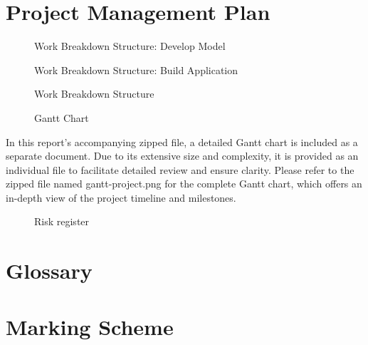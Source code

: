 \documentclass[journal, draftcls]{IEEEtran}
\begin{document}
\section{Project Management Plan}
\begin{figure}[ht]
    
    \caption{Work Breakdown Structure: Develop Model}
    \label{fig:WBS: Develop Model}
\end{figure}
\newpage
\begin{landscape}
    \begin{figure}[ht]
        
        \caption{Work Breakdown Structure: Build Application}
        \label{fig:WBS: Build Application}
    \end{figure}
\end{landscape}
\newpage
\begin{figure}[ht]
    
    \caption{Work Breakdown Structure}
    \label{fig:WBS: Project Charter}
\end{figure}
\newpage
\begin{landscape}
    \begin{figure}[ht]
        \centering
        \caption{Gantt Chart}
        \label{fig:GanttChart}
    \end{figure}
    In this report's accompanying zipped file, a detailed Gantt chart is included as a separate document. Due to its extensive size and complexity, it is provided as an individual file to facilitate detailed review and ensure clarity. Please refer to the zipped file named gantt-project.png for the complete Gantt chart, which offers an in-depth view of the project timeline and milestones.
\end{landscape}
\newpage
\begin{figure}[ht]
    
    \caption{Risk register}
    \label{fig:Risk Register}
\end{figure}
\section{Glossary}
\section{Marking Scheme}
\end{document}
